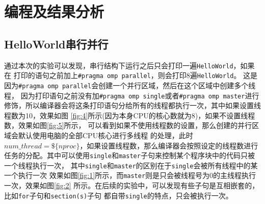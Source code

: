 \documentclass{article}
\begin{document}
\section{编程及结果分析}
\subsection{HelloWorld串行并行}
\indent 通过本次的实验可以发现，串行结构下运行之后只会打印一遍\texttt{HelloWorld}，如果在
打印的语句之前加上\texttt{\#pragma omp parallel}，则会打印8遍\texttt{HelloWorld}。
这是因为\texttt{\#pragma omp parallel}会创建一个并行区域，然后在这个区域中创建多个线程，
因为打印语句之前没有加\texttt{\#pragma omp single}或者\texttt{\#pragma omp master}进行
修饰，所以编译器会将这条打印语句分给所有的线程都执行一次，其中如果设置线程数为10，效果如图
\ref{fig:4}所示(因为本身CPU的核心数就为8)，如果不设置线程数，效果如图\ref{fig:5}所示，
可以看到如果不使用线程数的设置，那么创建的并行区域会默认使用电脑的全部CPU核心进行多线程
的处理，此时$num\_thread=\$\{nproc\}$，如果设置线程数，那么编译器会按照设定的线程数进行
任务的分配。其中可以使用\texttt{single}和\texttt{master}子句来控制某个程序块中的代码只被一个线程执行一次，
其中\texttt{single}和\texttt{master}的区别在于\texttt{single}会被所有线程中的某一个执行一次
效果如图\ref{fig:1}所示，而\texttt{master}则是只会被线程号为0的主线程执行一次，效果如图\ref{fig:2}
所示。在后续的实验中，可以发现有些子句是互相嵌套的，比如\texttt{for}子句和\texttt{section(s)}子句
都自带\texttt{single}的特点，只会被执行一次。
\end{document}
